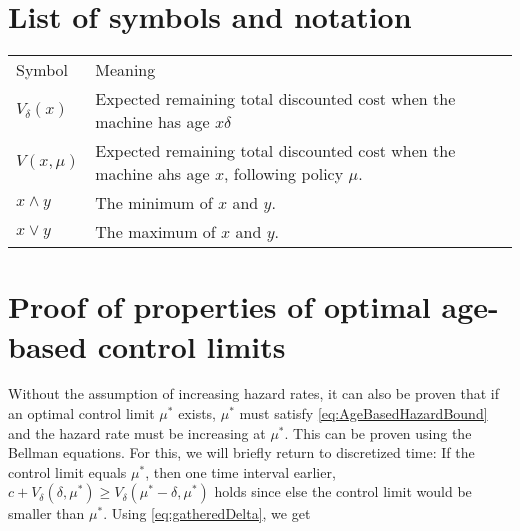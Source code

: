 \documentclass[a4paper]{thesis}
\theoremstyle{definition}
\begin{document}
\begin{appendices}
	\chapter{List of symbols and notation}\label{AppendixSymbolsAndNotation}
\begin{table}[]
	\begin{tabular}{ll}
		Symbol        & Meaning                                                                                        \\
		$V_\delta(x)$ & Expected remaining total discounted cost when the machine has age $x\delta$                    \\
		$V(x,\mu)$    & Expected remaining total discounted cost when the machine ahs age $x$, following policy $\mu$. \\
		$x\wedge y$   & The minimum of $x$ and $y$.                                                                    \\
		$x\vee y$     & The maximum of $x$ and $y$.
	\end{tabular}
\end{table} 	\chapter{Proof of properties of optimal age-based control limits}\label{AppendixAgeBasedControlLimit}
Without the assumption of increasing hazard rates, it can also be proven that if an optimal control limit $\mu^*$ exists, $\mu^*$ must satisfy \eqref{eq:AgeBasedHazardBound} and the hazard rate must be increasing at $\mu^*$.
This can be proven using the Bellman equations.
For this, we will briefly return to discretized time:
If the control limit equals $\mu^*$, then one time interval earlier, $c+V_\delta(\delta,\mu^*)\geq V_\delta(\mu^*-\delta,\mu^*)$ holds since else the control limit would be smaller than $\mu^*$.
Using \eqref{eq:gatheredDelta}, we get


\end{appendices}
\end{document}
